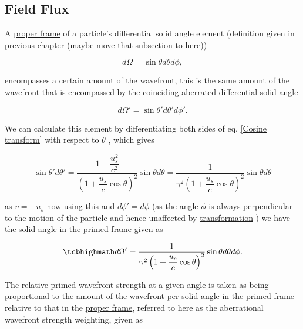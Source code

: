 \subsection{Field Flux}

A \hyperlink{def-proper-frame}{proper frame} of a particle's differential solid angle element (definition given in previous chapter (maybe move that subsection to here))

\begin{equation}
	d\Omega = \sin{\theta} d\theta d\phi,
\end{equation}

encompasses a certain amount of the wavefront, this is the same amount of the wavefront that is encompassed by the coinciding aberrated differential solid angle

\begin{equation}
	d\Omega' = \sin{\theta'} d\theta' d\phi'.
\end{equation}

We can calculate this element by differentiating both sides of eq. \eqref{Cosine transform} with respect to $\theta$ \cite{hogg1997special}, which gives

\begin{equation}
	\sin{\theta'} d\theta' = \dfrac{1-\dfrac{u_s^2}{c^2}}{\left(1+\dfrac{u_s}{c}\cos{\theta}\right)^2} \sin{\theta} d\theta = \dfrac{1}{{\gamma}^2\left(1+\dfrac{u_s}{c}\cos{\theta}\right)^2} \sin{\theta} d\theta
\end{equation}

as $v=-u_s$ now using this and $d\phi'=d\phi$ (as the angle $\phi$ is always perpendicular to the motion of the particle and hence unaffected by \hyperlink{def-transform}{transformation} ) we have the solid angle in the \hyperlink{def-Primed-Frame}{primed frame} given as

\begin{equation}
	\mhl{
		d\Omega' = \dfrac{1}{{\gamma}^2\left(1+\dfrac{u_s}{c}\cos{\theta}\right)^2} \sin{\theta} d\theta d\phi.
	}
\end{equation}

The relative primed wavefront strength at a given angle is taken as being proportional to the amount of the wavefront per solid angle in the \hyperlink{def-Primed-Frame}{primed frame} relative to that in the \hyperlink{def-proper-frame}{proper frame}, referred to here as the aberrational wavefront strength weighting, given as

